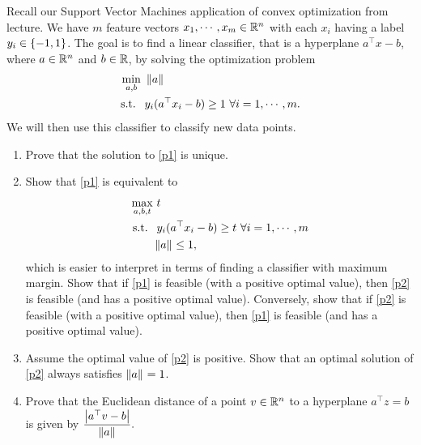 {}






\newpage

\pb

Recall our Support Vector Machines application of convex optimization from lecture. We have $m$ feature vectors $x_{1},\cdots,x_{m} \in \mathbb{R}^{n}$ with each $x_{i}$ having a label $y_{i} \in \left\{-1,1\right\}$. The goal is to find a linear classifier, that is a hyperplane $a^{\top} x - b$, where $a \in \mathbb{R}^{n}$ and $b \in \mathbb{R}$, by solving the optimization problem 
\begin{equation}\begin{aligned} \label{p1}
\min_{a,b} &~\left\lVert a \right\rVert_{}\\
\text{s.t. } &~y_{i}(a^{\top}x_{i}-b)\ge 1~\forall i=1,\cdots,m.
\end{aligned}\end{equation} 
We will then use this classifier to classify new data points.
\begin{enumerate}[leftmargin=*]
\item Prove that the solution to \ref{p1} is unique.
\item Show that \ref{p1} is equivalent to \begin{equation}\begin{aligned} \label{p2}
\max_{a,b,t} &~t\\
\text{s.t. } &~y_{i}(a^{\top}x_{i}-b)\ge t~\forall i=1,\cdots,m\\
&\left\lVert a \right\rVert_{}\le 1,
\end{aligned}\end{equation} which is easier to interpret in terms of finding a classifier with maximum margin. Show that if \ref{p1} is feasible (with a positive optimal value), then \ref{p2} is feasible (and has a positive optimal value). Conversely, show that if \ref{p2} is feasible (with a positive optimal value), then \ref{p1} is feasible (and has a positive optimal value).
\item Assume the optimal value of \ref{p2} is positive. Show that an optimal solution of \ref{p2} always satisfies $\left\lVert a \right\rVert_{} = 1$.
\item Prove that the Euclidean distance of a point $v \in \mathbb{R}^{n}$ to a hyperplane $a^{\top} z = b$ is given by $\displaystyle\frac{\left| a^{\top}v-b \right|}{\left\lVert a \right\rVert_{}}.$
\end{enumerate}


\soln

